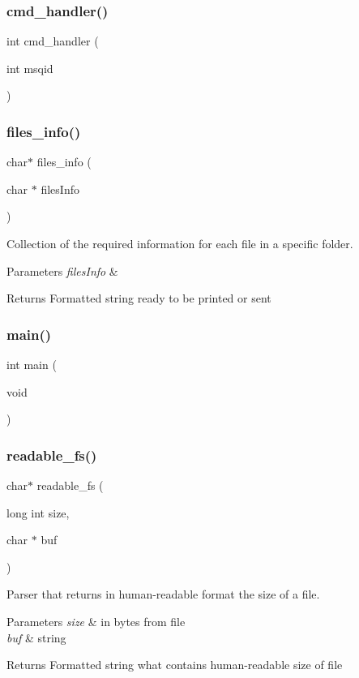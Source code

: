 \subsubsection{cmd\+\_\+handler()}
{\footnotesize\ttfamily int cmd\+\_\+handler (\begin{DoxyParamCaption}\item[{int}]{msqid }\end{DoxyParamCaption})}

\mbox{\label{fileserv_8c_a28f9a6d37e4dbc8b5bf5fad1025285e3}} 
\subsubsection{files\+\_\+info()}
{\footnotesize\ttfamily char$\ast$ files\+\_\+info (\begin{DoxyParamCaption}\item[{char $\ast$}]{files\+Info }\end{DoxyParamCaption})}



Collection of the required information for each file in a specific folder. 


\begin{DoxyParams}{Parameters}
{\em files\+Info} & \\
\hline
\end{DoxyParams}
\begin{DoxyReturn}{Returns}
Formatted string ready to be printed or sent 
\end{DoxyReturn}
\mbox{\label{fileserv_8c_a840291bc02cba5474a4cb46a9b9566fe}} 
\subsubsection{main()}
{\footnotesize\ttfamily int main (\begin{DoxyParamCaption}\item[{void}]{ }\end{DoxyParamCaption})}

\mbox{\label{fileserv_8c_acb8985a720cf17b68e99872ba793f2cc}} 
\subsubsection{readable\+\_\+fs()}
{\footnotesize\ttfamily char$\ast$ readable\+\_\+fs (\begin{DoxyParamCaption}\item[{long int}]{size,  }\item[{char $\ast$}]{buf }\end{DoxyParamCaption})}



Parser that returns in human-\/readable format the size of a file. 


\begin{DoxyParams}{Parameters}
{\em size} & in bytes from file \\
\hline
{\em buf} & string \\
\hline
\end{DoxyParams}
\begin{DoxyReturn}{Returns}
Formatted string what contains human-\/readable size of file 
\end{DoxyReturn}
